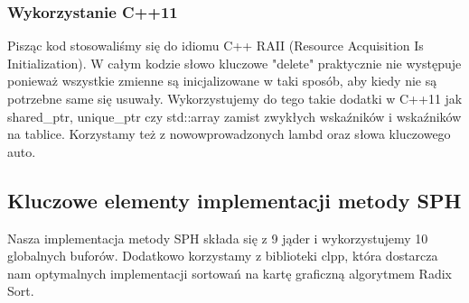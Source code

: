 \documentclass[polish, 12pt]{aghthesis}
\begin{document}
		\subsubsection{Wykorzystanie C++11}
		
		Pisząc kod stosowaliśmy się do idiomu C++ RAII (Resource Acquisition Is Initialization). W całym kodzie słowo kluczowe "delete" praktycznie nie występuje ponieważ wszystkie zmienne są inicjalizowane w taki sposób, aby kiedy nie są potrzebne same się usuwały. Wykorzystujemy do tego takie dodatki w C++11 jak shared\_ptr, unique\_ptr czy std::array zamist zwykłych wskaźników i wskaźników na tablice. Korzystamy też z nowowprowadzonych lambd oraz słowa kluczowego auto.
		
	\subsection{Kluczowe elementy implementacji metody SPH}
		
		Nasza implementacja metody SPH składa się z 9 jąder i wykorzystujemy 10 globalnych buforów. Dodatkowo korzystamy z biblioteki clpp, która dostarcza nam optymalnych implementacji sortowań na kartę graficzną algorytmem Radix Sort.
		
\end{document}
